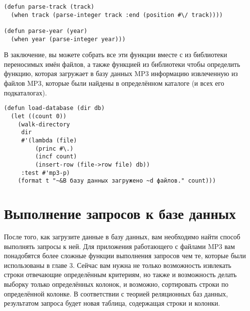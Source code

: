 \begin{lstlisting}
(defun parse-track (track)
  (when track (parse-integer track :end (position #\/ track))))

(defun parse-year (year)
  (when year (parse-integer year)))
\end{lstlisting}

В заключение, вы можете собрать все эти функции вместе с  из
библиотеки переносимых имён файлов, а также функцией  из библиотеки
 чтобы определить функцию, которая загружает в базу данных MP3 информацию
извлеченную из файлов MP3, которые были найдены в определённом каталоге (и всех его
подкаталогах).

\begin{lstlisting}
(defun load-database (dir db)
  (let ((count 0))
    (walk-directory 
     dir 
     #'(lambda (file)
         (princ #\.)
         (incf count)
         (insert-row (file->row file) db))
     :test #'mp3-p)
    (format t "~&В базу данных загружено ~d файлов." count)))
\end{lstlisting}

\section{Выполнение запросов к базе данных}

После того, как загрузите данные в базу данных, вам необходимо найти способ выполнять
запросы к ней.  Для приложения работающего с файлами MP3 вам понадобятся более сложные
функции выполнения запросов чем те, которые были использованы в главе 3.  Сейчас вам нужна
не только возможность извлекать строки отвечающие определённым критериям, но также и
возможность делать выборку только определённых колонок, и возможно, сортировать строки по
определённой колонке.  В соответствии с теорией реляционных баз данных, результатом
запроса будет новая таблица, содержащая строки и колонки.

